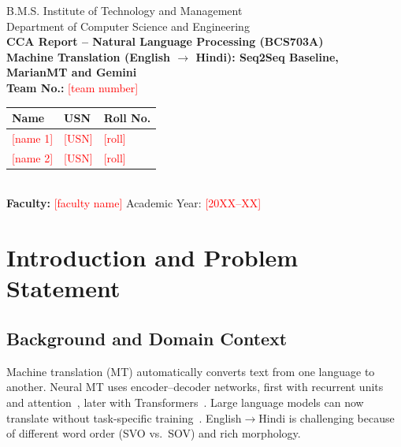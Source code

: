 \documentclass[12pt,a4paper]{article}
\newcommand{\todo}[1]{\textcolor{red}{[#1]}}
\begin{document}
\begin{titlepage}\centering
{\large B.M.S. Institute of Technology and Management\\ Department of Computer Science and Engineering}\\[1.5cm]
{\Large \textbf{CCA Report -- Natural Language Processing (BCS703A)}}\\[1cm]
{\LARGE \textbf{Machine Translation (English $\rightarrow$ Hindi): Seq2Seq Baseline, MarianMT and Gemini}}\\[1.5cm]
\textbf{Team No.:} \todo{team number}\\[0.5cm]
\begin{tabular}{lll}\toprule \textbf{Name} & \textbf{USN} & \textbf{Roll No.} \\ \midrule
\todo{name 1} & \todo{USN} & \todo{roll} \\ \todo{name 2} & \todo{USN} & \todo{roll} \\ \bottomrule\end{tabular}\\[1.5cm]
\textbf{Faculty:} \todo{faculty name} \qquad Academic Year: \todo{20XX--XX}
\end{titlepage}

\begin{abstract}
This project compares three English-to-Hindi machine translation approaches on the OPUS-100 corpus: a small GRU encoder--decoder
with attention trained from scratch, a pretrained translation tool (MarianMT), and a large language model (Google Gemini) used with zero-shot,
few-shot and chain-of-thought prompts. Text is cleaned, tokenized and analysed with spaCy (POS tags and dependency parse) before training.
All systems are scored on the same test sentences using BLEU, chrF and ROUGE-1 and compared on speed and error types.
The from-scratch model reached BLEU \todo{x}, MarianMT \todo{y} and the best Gemini prompt \todo{z}.
\todo{Add 2--3 sentences with your main conclusion, e.g.\ which system is best and when the small model is still useful.}
\end{abstract}

\tableofcontents\newpage

\section{Introduction and Problem Statement}
\subsection{Background and Domain Context}
Machine translation (MT) automatically converts text from one language to another. Neural MT uses encoder--decoder networks, first with recurrent units
and attention~\cite{bahdanau2015}, later with Transformers~\cite{tiedemann2020}. Large language models can now translate without task-specific training~\cite{brown2020}.
English$\rightarrow$Hindi is challenging because of different word order (SVO vs.\ SOV) and rich morphology.
\end{document}
